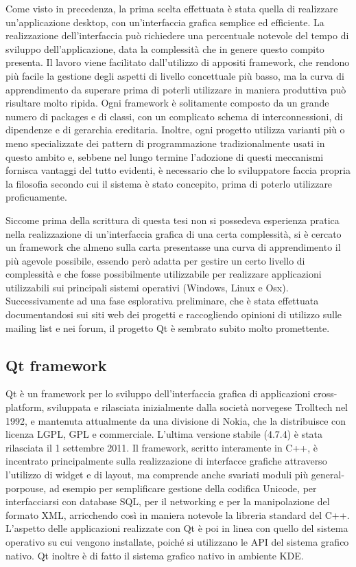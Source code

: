 \documentclass[12pt]{toptesi}
\begin{document}
Come visto in precedenza, la prima scelta effettuata è stata quella di realizzare un'applicazione desktop, con un'interfaccia grafica semplice ed efficiente. La realizzazione dell'interfaccia può richiedere una percentuale notevole del tempo di sviluppo dell'applicazione, data la complessità che in genere questo compito presenta. Il lavoro viene facilitato dall'utilizzo di appositi framework, che rendono più facile la gestione degli aspetti di livello concettuale più basso, ma la curva di apprendimento da superare prima di poterli utilizzare in maniera produttiva può risultare molto ripida. Ogni framework è solitamente composto da un grande numero di packages e di classi, con un complicato schema di interconnessioni, di dipendenze e di gerarchia ereditaria. Inoltre, ogni progetto utilizza varianti più o meno specializzate dei pattern di programmazione tradizionalmente usati in questo ambito e, sebbene nel lungo termine l'adozione di questi meccanismi fornisca vantaggi del tutto evidenti, è necessario che lo sviluppatore faccia propria la filosofia secondo cui il sistema è stato concepito, prima di poterlo utilizzare proficuamente.

Siccome prima della scrittura di questa tesi non si possedeva esperienza pratica nella realizzazione di un'interfaccia grafica di una certa complessità, si è cercato un framework che almeno sulla carta presentasse una curva di apprendimento il più agevole possibile, essendo però adatta per gestire un certo livello di complessità e che fosse possibilmente utilizzabile per realizzare applicazioni utilizzabili sui principali sistemi operativi (Windows, Linux e Osx). 
Successivamente ad una fase esplorativa preliminare, che è stata effettuata documentandosi sui siti web dei progetti e raccogliendo opinioni di utilizzo sulle mailing list e nei forum, il progetto Qt è sembrato subito molto promettente. 

\subsection{Qt framework}

Qt è un framework per lo sviluppo dell'interfaccia grafica di applicazioni cross-platform, sviluppata e rilasciata inizialmente dalla società norvegese Trolltech nel 1992, e mantenuta attualmente da una divisione di Nokia, che la distribuisce con licenza LGPL, GPL e commerciale. L'ultima versione stabile (4.7.4) è stata rilasciata il 1 settembre 2011. Il framework, scritto interamente in C++, è incentrato principalmente sulla realizzazione di interfacce grafiche attraverso l'utilizzo di widget e di layout, ma comprende anche svariati moduli più general-porpouse, ad esempio per semplificare gestione della codifica Unicode, per interfacciarsi con database SQL, per il networking e per la manipolazione del formato XML, arricchendo così in maniera notevole la libreria standard del C++. L'aspetto delle applicazioni realizzate con Qt è poi in linea con quello del sistema operativo su cui vengono installate, poiché si utilizzano le API del sistema grafico nativo. Qt inoltre è di fatto il sistema grafico nativo in ambiente KDE. 
\end{document}
